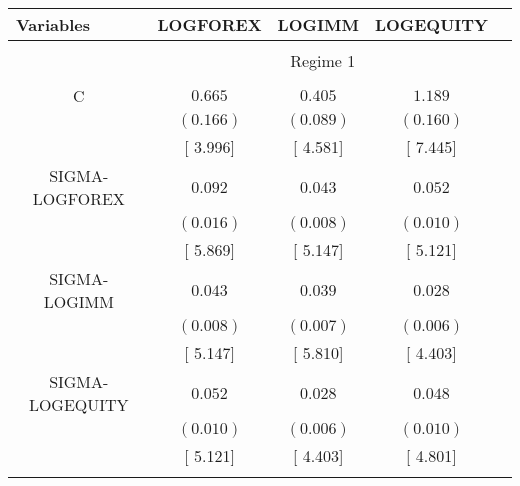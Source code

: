 \begin{tabular}{lrrrr}
\toprule
\textbf{Variables} & {\textbf{LOGFOREX}}&\multicolumn{1}{c}{\textbf{LOGIMM}}&\multicolumn{1}{c}{\textbf{LOGEQUITY}}&\multicolumn{1}{c}{}\\
[2.5pt] \hline \\ [-2.5pt]
\multicolumn{1}{c}{}&\multicolumn{3}{c}{Regime 1}&\multicolumn{1}{c}{}\\
[2.5pt] \hline \\ [-2.5pt]
\multicolumn{1}{c}{C}&\multicolumn{1}{c}{$0.665$}&\multicolumn{1}{c}{$0.405$}&\multicolumn{1}{c}{$1.189$}&\multicolumn{1}{c}{}\\
\multicolumn{1}{c}{}&\multicolumn{1}{c}{$(0.166)$}&\multicolumn{1}{c}{$(0.089)$}&\multicolumn{1}{c}{$(0.160)$}&\multicolumn{1}{c}{}\\
\multicolumn{1}{c}{}&\multicolumn{1}{c}{[ 3.996]}&\multicolumn{1}{c}{[ 4.581]}&\multicolumn{1}{c}{[ 7.445]}&\multicolumn{1}{c}{}\\
\multicolumn{1}{c}{SIGMA-LOGFOREX}&\multicolumn{1}{c}{$0.092$}&\multicolumn{1}{c}{$0.043$}&\multicolumn{1}{c}{$0.052$}&\multicolumn{1}{c}{}\\
\multicolumn{1}{c}{}&\multicolumn{1}{c}{$(0.016)$}&\multicolumn{1}{c}{$(0.008)$}&\multicolumn{1}{c}{$(0.010)$}&\multicolumn{1}{c}{}\\
\multicolumn{1}{c}{}&\multicolumn{1}{c}{[ 5.869]}&\multicolumn{1}{c}{[ 5.147]}&\multicolumn{1}{c}{[ 5.121]}&\multicolumn{1}{c}{}\\
\multicolumn{1}{c}{SIGMA-LOGIMM}&\multicolumn{1}{c}{$0.043$}&\multicolumn{1}{c}{$0.039$}&\multicolumn{1}{c}{$0.028$}&\multicolumn{1}{c}{}\\
\multicolumn{1}{c}{}&\multicolumn{1}{c}{$(0.008)$}&\multicolumn{1}{c}{$(0.007)$}&\multicolumn{1}{c}{$(0.006)$}&\multicolumn{1}{c}{}\\
\multicolumn{1}{c}{}&\multicolumn{1}{c}{[ 5.147]}&\multicolumn{1}{c}{[ 5.810]}&\multicolumn{1}{c}{[ 4.403]}&\multicolumn{1}{c}{}\\
\multicolumn{1}{c}{SIGMA-LOGEQUITY}&\multicolumn{1}{c}{$0.052$}&\multicolumn{1}{c}{$0.028$}&\multicolumn{1}{c}{$0.048$}&\multicolumn{1}{c}{}\\
\multicolumn{1}{c}{}&\multicolumn{1}{c}{$(0.010)$}&\multicolumn{1}{c}{$(0.006)$}&\multicolumn{1}{c}{$(0.010)$}&\multicolumn{1}{c}{}\\
\multicolumn{1}{c}{}&\multicolumn{1}{c}{[ 5.121]}&\multicolumn{1}{c}{[ 4.403]}&\multicolumn{1}{c}{[ 4.801]}&\multicolumn{1}{c}{}\\
[2.5pt] \hline \\ [-2.5pt]

\end{tabular}
